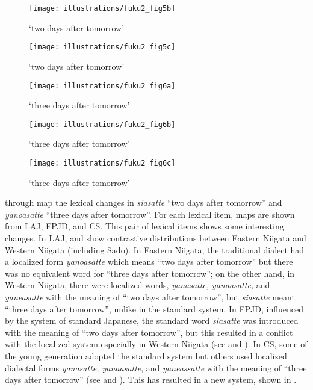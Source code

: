 \documentclass[output=paper]{LSP/langsci}
\begin{document}
\begin{figure}
\texttt{[image: illustrations/fuku2\_fig5b]}
\caption{`two days after tomorrow'}
\label{fig:5b}
\end{figure}

\begin{figure}
\texttt{[image: illustrations/fuku2\_fig5c]}
\caption{`two days after tomorrow'}
\label{fig:5c}
\end{figure}

\begin{figure}
\texttt{[image: illustrations/fuku2\_fig6a]}
\caption{`three days after tomorrow'}
\label{fig:6a}
\end{figure}

\begin{figure}
\texttt{[image: illustrations/fuku2\_fig6b]}
\caption{`three days after tomorrow'}
\label{fig:6b}
\end{figure}

\begin{figure}
\texttt{[image: illustrations/fuku2\_fig6c]}
\caption{`three days after tomorrow'}
\label{fig:6c}
\end{figure}

 through  map the lexical changes in \textit{siasatte} “two days after tomorrow” and \textit{yanoasatte} “three days after tomorrow”.  For each lexical item, maps are shown from LAJ, FPJD, and CS. This pair of lexical items shows some interesting changes.  In LAJ,  and  show contrastive distributions between Eastern Niigata and Western Niigata (including Sado).  In Eastern Niigata, the traditional dialect had a localized form \textit{yanoasatte} which means “two days after tomorrow” but there was no equivalent word for “three days after tomorrow”; on the other hand, in Western Niigata, there were localized words, \textit{yanasatte, yanaasatte,} and \textit{yaneasatte} with the meaning of “two days after tomorrow”, but \textit{siasatte} meant “three days after tomorrow”, unlike in the standard system. In FPJD, influenced by the system of standard Japanese, the standard word \textit{siasatte} was introduced with the meaning of “two days after tomorrow”, but this resulted in a conflict with the localized system especially in Western Niigata (see  and ).  In CS, some of the young generation adopted the standard system but others used localized dialectal forms \textit{yanasatte, yanaasatte}, and \textit{yaneassatte} with the meaning of “three days after tomorrow” (see  and ). This has resulted in a new system, shown in .
\end{document}
